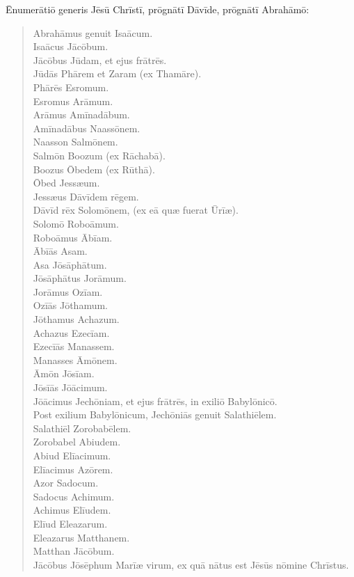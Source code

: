 
\Caput
\Versus Ēnumerātiō generis Jēsū Chrīstī, prōgnātī Dāvīde, prōgnātī Abrahāmō:

\begin{verse}
\begin{patverse*}
\Versus Abrahāmus genuit Isaācum.\\
Isaācus Jācōbum.\\
Jācōbus Jūdam, et ejus frātrēs.\\
\Versus Jūdās Phārem et Zaram (ex Thamāre).\\
Phārēs Esromum.\\
Esromus Arāmum.\\ 
\Versus Arāmus Amīnadābum.\\
Amīnadābus Naassōnem.\\
Naasson Salmōnem.\\
\Versus Salmōn Boozum (ex Rāchabā).\\
Boozus Ōbedem (ex Rūthā).\\
Ōbed Jessæum.\\
\Versus Jessæus Dāvīdem rēgem.\\
Dāvīd rēx Solomōnem, (ex eā quæ fuerat Ūrīæ).\\
\Versus Solomō Roboāmum.\\
Roboāmus Ābīam.\\
Ābīās Asam.\\
\Versus Asa Jōsāphātum.\\
Jōsāphātus Jorāmum.\\
Jorāmus Ozīam.\\
\Versus Ozīās Jōthamum.\\
Jōthamus Achazum.\\
Achazus Ezecīam.\\
\Versus Ezecīās Manassem.\\
Manasses Āmōnem.\\
Āmōn Jōsīam.\\ 
\Versus Jōsīās Jōācimum.\\
Jōācimus Jechōniam, et ejus frātrēs, in exiliō Babylōnicō.\\
\Versus Post exilium Babylōnicum, Jechōniās genuit Salathiēlem.\\
Salathiēl Zorobabēlem.\\ 
\Versus Zorobabel Abiudem.\\
Abiud Elīacimum.\\
Elīacimus Azōrem.\\ 
\Versus Azor Sadocum.\\
Sadocus Achimum.\\
Achimus Elīudem.\\ 
\Versus Elīud Eleazarum.\\
Eleazarus Matthanem.\\
Matthan Jācōbum.\\ 
\Versus Jācōbus Jōsēphum Marīæ virum, ex quā nātus est Jēsūs nōmine Chrīstus.
\end{patverse*}
\end{verse}

